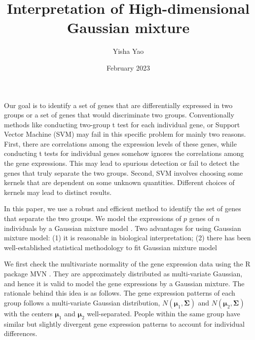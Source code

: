 \documentclass{article}
\title{Interpretation of High-dimensional Gaussian mixture}
\author{Yisha Yao}
\date{February 2023}
\numberwithin{equation}{section}
\begin{document}
\maketitle

Our goal is to identify a set of genes that are differentially expressed in two groups or a set of genes that would discriminate two groups. Conventionally methods like conducting two-group t test for each individual gene, or Support Vector Machine (SVM) may fail in this specific problem for mainly two reasons. First, there are correlations among the expression levels of these genes, while conducting t tests for individual genes somehow ignores the correlations among the gene expressions. This may lead to spurious detection or fail to detect the genes that truly separate the two groups. Second, SVM involves choosing some kernels that are dependent on some unknown quantities. Different choices of kernels may lead to distinct results. 

In this paper, we use a robust and efficient method to identify the set of genes that separate the two groups. We model the expressions of $p$ genes of $n$ individuals by a Gaussian mixture model \citep{reynolds2009gaussian}. Two advantages for using Gaussian mixture model: (1) it is reasonable in biological interpretation; (2) there has been well-established statistical methodology to fit Gaussian mixture model

We first check the multivariate normality of the gene expression data using the R package MVN \citep{korkmaz2014mvn}. They are approximately distributed as multi-variate Gaussian, and hence it is valid to model the gene expressions by a Gaussian mixture. 
The rationale behind this idea is as follows. The gene expression patterns of each group follows a multi-variate Gaussian distribution, $N(\boldsymbol{\mu}_1, \boldsymbol{\Sigma})$ and $N(\boldsymbol{\mu}_2, \boldsymbol{\Sigma})$ with the centers $\boldsymbol{\mu}_1$ and $\boldsymbol{\mu}_2$ well-separated. People within the same group have similar but slightly divergent gene expression patterns to account for individual differences. 
\end{document}
